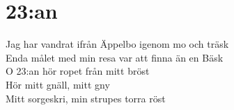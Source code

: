 \section{23:an}
Jag har vandrat ifrån Äppelbo igenom mo och träsk\\
Enda målet med min resa var att finna än en Bäsk\\
O 23:an hör ropet från mitt bröst\\
Hör mitt gnäll, mitt gny\\
Mitt sorgeskri, min strupes torra röst\\